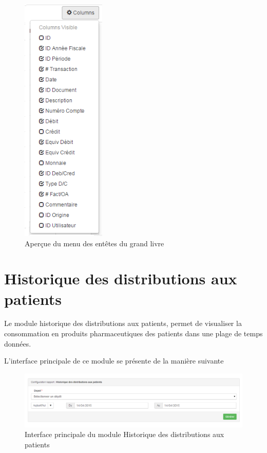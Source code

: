 \documentclass[12pt,a4paper]{report}
\begin{document}
\begin{figure}[h]
\begin{center}
\includegraphics[width=4cm]{pic/ListeGrandLivre.png}
\end{center}
\caption{Aperçue du menu des entêtes du grand livre}
\label{Aperçue du menu des entêtes du grand livre}
\end{figure}

\newpage
\section{Historique des distributions aux patients}
Le module historique des distributions aux patients, permet de visualiser la consommation en produits pharmaceutiques des patients dans une plage de temps données.

L'interface principale de ce module se présente de la manière suivante

\begin{figure}[h]
\begin{center}
\includegraphics[width=14cm]{pic/HistDistrPatient.png}
\end{center}
\caption{Interface principale du module Historique des distributions aux patients}
\label{Interface principale du module Historique des distributions aux patients}
\end{figure}
\end{document}
